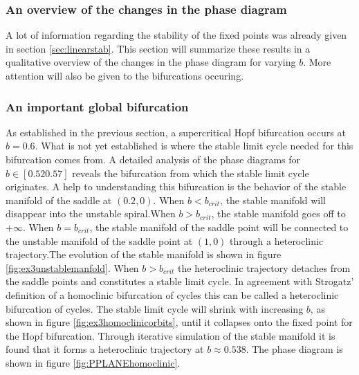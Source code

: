 \subsubsection{An overview of the changes in the phase diagram}
A lot of information regarding the stability of the fixed points was already given in section \ref{sec:linearstab}. This section will summarize these results in a qualitative overview of the changes in the phase diagram for varying $b$. More attention will also be given to the bifurcations occuring.

\subsubsection{An important global bifurcation}
As established in the previous section, a supercritical Hopf bifurcation occurs at $b=0.6$. What is not yet established is where the stable limit cycle needed for this bifurcation comes from. A detailed analysis of the phase diagrams for $b \in [0.52 0.57]$ reveals the bifurcation from which the stable limit cycle originates. A help to understanding this bifurcation is the behavior of the stable manifold of the saddle at $(0.2,0)$. When $b<b_{crit}$, the stable manifold will disappear into the unstable spiral.When $b>b_{crit}$, the stable manifold goes off to $+\infty$.  When $b=b_{crit}$, the stable manifold of the saddle point will be connected to the unstable manifold of the saddle point at $(1,0)$ through a heteroclinic trajectory.The evolution of the stable manifold is shown in figure \ref{fig:ex3unstablemanfold}.
\newline
\newline
When $b>b_{crit}$ the heteroclinic trajectory detaches from the saddle points and constitutes a stable limit cycle. In agreement with Strogatz' definition of a homoclinic bifurcation of cycles this can be called a heteroclinic bifurcation of cycles. The stable limit cycle will shrink with increasing $b$, as shown in figure \ref{fig:ex3homoclinicorbits}, until it collapses onto the fixed point for the Hopf bifurcation.
\newline
\newline
Through iterative simulation of the stable manifold it is found that it forms a heteroclinic trajectory at $b\approx0.538$. The phase diagram is shown in figure \ref{fig:PPLANEhomoclinic}.
